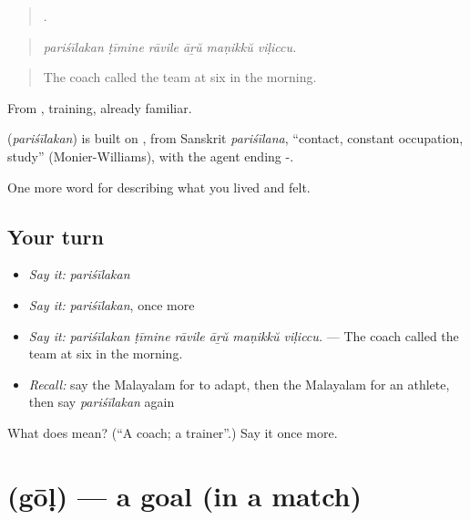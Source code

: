 \begin{quote}
     .
\end{quote}

\begin{quote}
\emph{pariśīlakan ṭīmine rāvile āṟŭ maṇikkŭ viḷiccu.}
\end{quote}

\begin{quote}
The coach called the team at six in the morning.
\end{quote}

From , training, already familiar.

\begin{cousinweb}
\textbf{} (\emph{pariśīlakan}) is built on , from Sanskrit \emph{pariśīlana}, \textquotedblleft{}contact, constant occupation, study\textquotedblright{} (Monier-Williams), with the agent ending -.
\end{cousinweb}

\begin{grammarlens}[title={What you've built}]
One more word for describing what you lived and felt.
\end{grammarlens}

\subsection*{Your turn}
\begin{itemize}
\raggedright
  \item \emph{Say it:} \emph{pariśīlakan}
  \item \emph{Say it:} \emph{pariśīlakan}, once more
  \item \emph{Say it:} \emph{pariśīlakan ṭīmine rāvile āṟŭ maṇikkŭ viḷiccu.} — The coach called the team at six in the morning.
  \item \emph{Recall:} say the Malayalam for to adapt, then the Malayalam for an athlete, then say \emph{pariśīlakan} again
\end{itemize}

\begin{tcolorbox}[breakable,colback=teal!4,colframe=teal!35!black,title={Before you move on}]
What does  mean? (\textquotedblleft{}A coach; a trainer\textquotedblright{}.) Say it once more.
\end{tcolorbox}
\section[\texorpdfstring{\ml{ഗോൾ} (gōḷ)}{ഗോൾ (gōḷ)}]{ (gōḷ) — a goal (in a match)}

